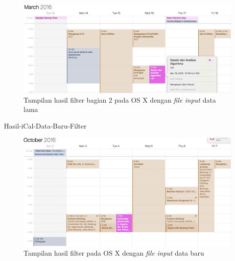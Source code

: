 			\begin{figure}[H]
			\centering
			\includegraphics[scale=0.4]{Gambar/Hasil-Import-Filter-2-on-Mac}
			\caption{Tampilan hasil filter bagian 2 pada OS X dengan \textit{file input} data lama}
			\label{fig:Hasil-Import-Filter-2-on-Mac}
			\end{figure}
			
			Hasil-iCal-Data-Baru-Filter
			\begin{figure}[H]
			\centering
			\includegraphics[scale=0.4]{Gambar/Hasil-iCal-Data-Baru-Filter}
			\caption{Tampilan hasil filter pada OS X dengan \textit{file input} data baru}
			\label{fig:Hasil-iCal-Data-Baru-Filter}
			\end{figure}
			